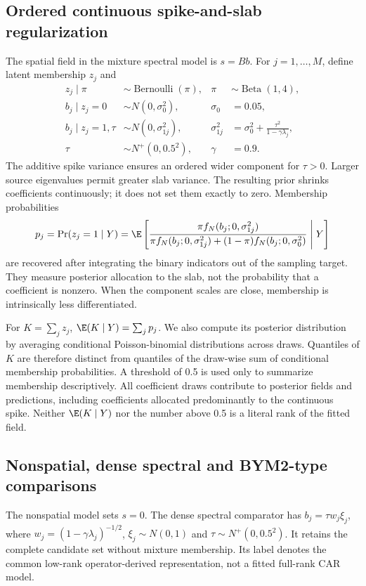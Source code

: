 \documentclass[11pt]{article}
\begin{document}
\subsection{Ordered continuous spike-and-slab regularization}
The spatial field in the mixture spectral model is $s=Bb$. For $j=1,\ldots,M$, define latent membership $z_j$ and
\begin{align}
 z_j\mid\pi&\sim\operatorname{Bernoulli}(\pi), & \pi&\sim\operatorname{Beta}(1,4),\\
 b_j\mid z_j=0&\sim N(0,\sigma_0^2), & \sigma_0&=0.05,\\
 b_j\mid z_j=1,\tau&\sim N(0,\sigma_{1j}^2), &
 \sigma_{1j}^2&=\sigma_0^2+\frac{\tau^2}{1-\gamma\lambda_j},\\
 \tau&\sim N^+(0,0.5^2), & \gamma&=0.9.
 \label{eq:mixture}
\end{align}
The additive spike variance ensures an ordered wider component for $\tau>0$. Larger source eigenvalues permit greater slab variance. The resulting prior shrinks coefficients continuously; it does not set them exactly to zero. Membership probabilities
\begin{equation}
 p_j=\Pr(z_j=1\mid Y)
 =\E\left[\frac{\pi f_N(b_j;0,\sigma_{1j}^2)}
 {\pi f_N(b_j;0,\sigma_{1j}^2)+(1-\pi)f_N(b_j;0,\sigma_0^2)}\;\middle|\;Y\right]
\end{equation}
are recovered after integrating the binary indicators out of the sampling target. They measure posterior allocation to the slab, not the probability that a coefficient is nonzero. When the component scales are close, membership is intrinsically less differentiated.

For $K=\sum_jz_j$, $\E(K\mid Y)=\sum_jp_j$. We also compute its posterior distribution by averaging conditional Poisson-binomial distributions across draws. Quantiles of $K$ are therefore distinct from quantiles of the draw-wise sum of conditional membership probabilities. A threshold of 0.5 is used only to summarize membership descriptively. All coefficient draws contribute to posterior fields and predictions, including coefficients allocated predominantly to the continuous spike. Neither $\E(K\mid Y)$ nor the number above 0.5 is a literal rank of the fitted field.

\subsection{Nonspatial, dense spectral and BYM2-type comparisons}
The nonspatial model sets $s=0$. The dense spectral comparator has $b_j=\tau w_j\xi_j$, where $w_j=(1-\gamma\lambda_j)^{-1/2}$, $\xi_j\sim N(0,1)$ and $\tau\sim N^+(0,0.5^2)$. It retains the complete candidate set without mixture membership. Its label denotes the common low-rank operator-derived representation, not a fitted full-rank CAR model.
\end{document}
